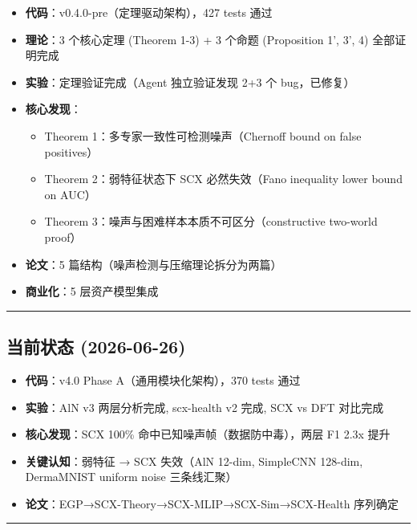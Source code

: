 \documentclass[
  12pt,
]{ctexart}
\providecommand{\tightlist}{%
  \setlength{\itemsep}{0pt}\setlength{\parskip}{0pt}}
\begin{document}
\begin{itemize}
\tightlist
\item
  \textbf{代码}：v0.4.0-pre（定理驱动架构），427 tests 通过
\item
  \textbf{理论}：3 个核心定理 (Theorem 1-3) + 3 个命题 (Proposition 1',
  3', 4) 全部证明完成
\item
  \textbf{实验}：定理验证完成（Agent 独立验证发现 2+3 个 bug，已修复）
\item
  \textbf{核心发现}：

  \begin{itemize}
  \tightlist
  \item
    Theorem 1：多专家一致性可检测噪声（Chernoff bound on false
    positives）
  \item
    Theorem 2：弱特征状态下 SCX 必然失效（Fano inequality lower bound on
    AUC）
  \item
    Theorem 3：噪声与困难样本本质不可区分（constructive two-world
    proof）
  \end{itemize}
\item
  \textbf{论文}：5 篇结构（噪声检测与压缩理论拆分为两篇）
\item
  \textbf{商业化}：5 层资产模型集成
\end{itemize}

\begin{center}\rule{0.5\linewidth}{0.5pt}\end{center}

\subsection{当前状态
(2026-06-26)}\label{ux5f53ux524dux72b6ux6001-2026-06-26}

\begin{itemize}
\tightlist
\item
  \textbf{代码}：v4.0 Phase A（通用模块化架构），370 tests 通过
\item
  \textbf{实验}：AlN v3 两层分析完成, scx-health v2 完成, SCX vs DFT
  对比完成
\item
  \textbf{核心发现}：SCX 100\% 命中已知噪声帧（数据防中毒），两层 F1
  2.3x 提升
\item
  \textbf{关键认知}：弱特征 → SCX 失效（AlN 12-dim, SimpleCNN 128-dim,
  DermaMNIST uniform noise 三条线汇聚）
\item
  \textbf{论文}：EGP→SCX-Theory→SCX-MLIP→SCX-Sim→SCX-Health 序列确定
\end{itemize}

\begin{center}\rule{0.5\linewidth}{0.5pt}\end{center}
\end{document}
